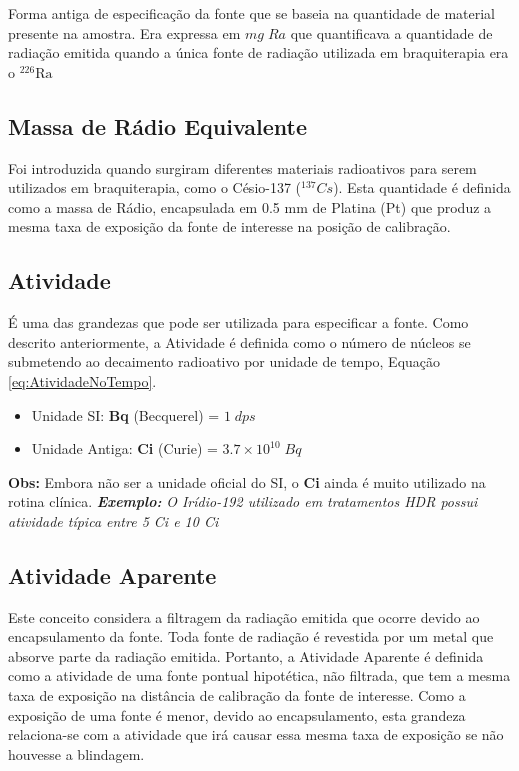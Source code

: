 \documentclass[11pt,a4paper]{article}
\begin{document}
			Forma antiga de especificação da fonte que se baseia na quantidade de material presente na amostra. Era expressa em $mg\; Ra$ que quantificava a quantidade de radiação emitida quando a única fonte de radiação utilizada em braquiterapia era o $\mathrm{{}^{226}Ra}$

		\subsection{Massa de Rádio Equivalente}

			Foi introduzida quando surgiram diferentes materiais radioativos para serem utilizados em braquiterapia, como o Césio-137 (${}^{137}Cs$). Esta quantidade é definida como a massa de Rádio, encapsulada em 0.5 mm de Platina (Pt) que produz a mesma taxa de exposição da fonte de interesse na posição de calibração.

		\subsection{Atividade}

			É uma das grandezas que pode ser utilizada para especificar a fonte. Como descrito anteriormente, a Atividade é definida como o número de núcleos se submetendo ao decaimento radioativo por unidade de tempo, Equação \ref{eq:AtividadeNoTempo}.

			\begin{itemize}
				\item Unidade SI: \textbf{Bq} (Becquerel) = $1\;dps$
				\item Unidade Antiga: \textbf{Ci} (Curie) = $3.7 \times 10^{10}\; Bq$
			\end{itemize}

			\textbf{\textbf{\textcolor{CarnationPink}{Obs:} } }Embora não ser a unidade oficial do SI, o \textbf{Ci} ainda é muito utilizado na rotina clínica. \textit{\textbf{\textcolor{CarnationPink}{Exemplo:}}} \textit{O Irídio-192 utilizado em tratamentos HDR possui atividade típica entre 5 Ci e 10 Ci}

		\subsection{Atividade Aparente}

			Este conceito considera a filtragem da radiação emitida que ocorre devido ao encapsulamento da fonte. Toda fonte de radiação é revestida por um metal que absorve parte da radiação emitida. Portanto, a Atividade Aparente é definida como a atividade de uma fonte pontual hipotética, não filtrada, que tem a mesma taxa de exposição na distância de calibração da fonte de interesse. Como a exposição de uma fonte é menor, devido ao encapsulamento, esta grandeza relaciona-se com a atividade que irá causar essa mesma taxa de exposição se não houvesse a blindagem.
	
\end{document}

